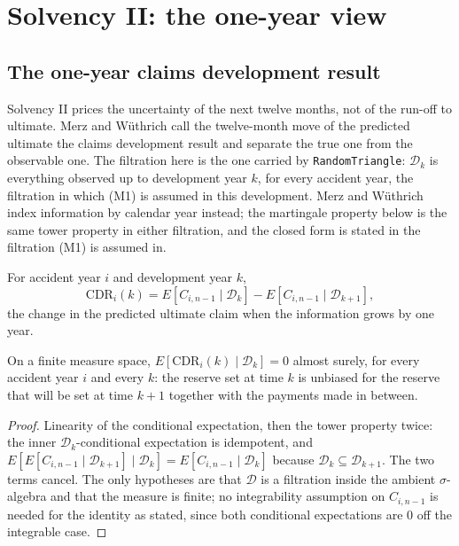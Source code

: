 \chapter{Solvency II: the one-year view}

\section{The one-year claims development result}

Solvency II prices the uncertainty of the next twelve months, not of the run-off to ultimate.
Merz and Wüthrich \cite{MerzWuethrich2008} call the twelve-month move of the predicted ultimate the claims
development result and separate the true one from the observable one. The filtration here is the
one carried by \texttt{RandomTriangle}: $\mathcal{D}_k$ is everything observed up to development
year $k$, for every accident year, the filtration in which (M1) is assumed in this development.
Merz and Wüthrich index information by calendar year instead; the martingale property below is
the same tower property in either filtration, and the closed form is stated in the filtration
(M1) is assumed in.

\begin{definition}\label{def:trueCDR}\leanok
{}
For accident year $i$ and development year $k$,
\[
  \mathrm{CDR}_i(k) = E[C_{i,n-1} \mid \mathcal{D}_k] - E[C_{i,n-1} \mid \mathcal{D}_{k+1}],
\]
the change in the predicted ultimate claim when the information grows by one year.
\end{definition}

\begin{theorem}\label{thm:cdr_martingale}\leanok
{}
On a finite measure space, $E[\mathrm{CDR}_i(k) \mid \mathcal{D}_k] = 0$ almost surely, for every
accident year $i$ and every $k$: the reserve set at time $k$ is unbiased for the reserve that
will be set at time $k+1$ together with the payments made in between.
\end{theorem}
\begin{proof}\leanok
Linearity of the conditional expectation, then the tower property twice: the inner
$\mathcal{D}_k$-conditional expectation is idempotent, and
$E[E[C_{i,n-1} \mid \mathcal{D}_{k+1}] \mid \mathcal{D}_k] = E[C_{i,n-1} \mid \mathcal{D}_k]$
because $\mathcal{D}_k \subseteq \mathcal{D}_{k+1}$. The two terms cancel. The only hypotheses
are that $\mathcal{D}$ is a filtration inside the ambient $\sigma$-algebra and that the measure
is finite; no integrability assumption on $C_{i,n-1}$ is needed for the identity as stated,
since both conditional expectations are $0$ off the integrable case.
\end{proof}

